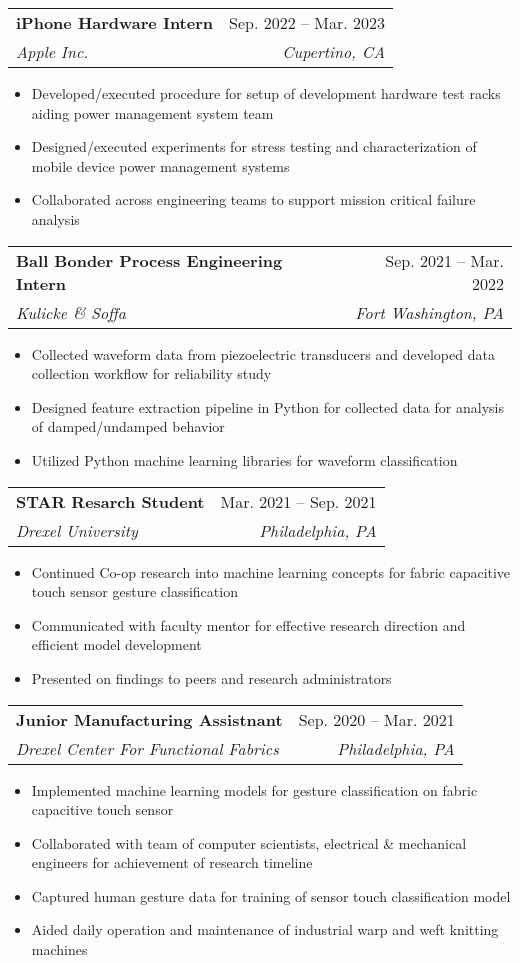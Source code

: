 \documentclass[letterpaper,11pt]{article}
\makeatletter
\newcommand{\resumeItem}[1]{
    \item\small{
        {#1 \vspace{-2pt}}
    }
}
\newcommand{\resumeSubheading}[4]{
    \vspace{-2pt}\item
    \begin{tabular*}{0.97\textwidth}[t]{l@{\extracolsep{\fill}}r}
        \textbf{#1} & #2 \\
        \textit{\small#3} & \textit{\small #4} \\
    \end{tabular*}\vspace{-7pt}
}
\newcommand{\resumeSubSubheading}[2]{
    \item
    \begin{tabular*}{0.97\textwidth}{l@{\extracolsep{\fill}}r}
        \textit{\small#1} & \textit{\small #2} \\
    \end{tabular*}\vspace{-7pt}
}
\newcommand{\resumeSubHeadingListEnd}{\end{itemize}}
\newcommand{\resumeItemListStart}{\begin{itemize}}
\newcommand{\resumeItemListEnd}{\end{itemize}\vspace{-5pt}}
\makeatother
\begin{document}

\resumeSubheading
{iPhone Hardware Intern}{Sep. 2022 -- Mar. 2023}
{Apple Inc.}{Cupertino, CA}
\resumeItemListStart
\resumeItem{Developed/executed procedure for setup of development hardware test racks aiding power management system team}
\resumeItem{Designed/executed experiments for stress testing and characterization of mobile device power management systems}
\resumeItem{Collaborated across engineering teams to support mission critical failure analysis}
\resumeItemListEnd

\resumeSubheading
{Ball Bonder Process Engineering Intern}{Sep. 2021 -- Mar. 2022}
{Kulicke \& Soffa}{Fort Washington, PA}
\resumeItemListStart
\resumeItem{Collected waveform data from piezoelectric transducers and developed data collection workflow for reliability study}
\resumeItem{Designed feature extraction pipeline in Python for collected data for analysis of damped/undamped behavior}
\resumeItem{Utilized Python machine learning libraries for waveform classification}
\resumeItemListEnd

\resumeSubheading
{STAR Resarch Student}{Mar. 2021 -- Sep. 2021}
{Drexel University}{Philadelphia, PA}
\resumeItemListStart
\resumeItem{Continued Co-op research into machine learning concepts for fabric capacitive touch sensor gesture classification}
\resumeItem{Communicated with faculty mentor for effective research direction and efficient model development}
\resumeItem{Presented on findings to peers and research administrators}
\resumeItemListEnd

\resumeSubheading
{Junior Manufacturing Assistnant}{Sep. 2020 -- Mar. 2021}
{Drexel Center For Functional Fabrics}{Philadelphia, PA}
\resumeItemListStart
\resumeItem{Implemented machine learning models for gesture classification on fabric capacitive touch sensor}
\resumeItem{Collaborated with team of computer scientists, electrical \& mechanical engineers for achievement of research timeline}
\resumeItem{Captured human gesture data for training of sensor touch classification model}
\resumeItem{Aided daily operation and maintenance of industrial warp and weft knitting machines}
\resumeItemListEnd
\end{document}
